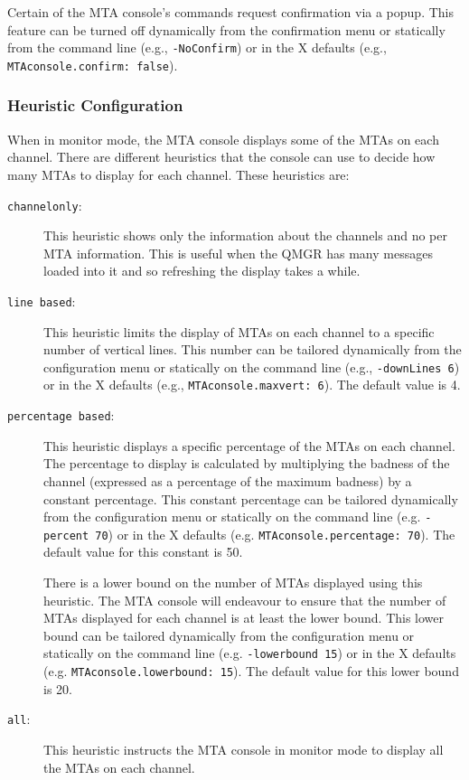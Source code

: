 Certain of the MTA console's commands request confirmation via a
popup.
This feature can be turned off dynamically from the confirmation menu
or statically from the command line (e.g., \verb+-NoConfirm+) or in the
X defaults (e.g., \verb+MTAconsole.confirm: false+).

\subsubsection 	{Heuristic Configuration} \label{sect:heur}

When in monitor mode, the MTA console displays some of the MTAs on each
channel.
There are different heuristics that the console can use to decide
how many MTAs to display for each channel.
These heuristics are:

\begin{description}
\item[\verb|channelonly|:] This heuristic shows only the information
about the channels and no per MTA information. This is useful when the
QMGR has many messages loaded into it and so refreshing the display
takes a while.

\item [\verb+line based+:] This heuristic limits the display of MTAs
on each channel to a specific number of vertical lines.  This number
can be tailored dynamically from the configuration menu or statically
on the command line (e.g., \verb+-downLines 6+) or in the X defaults
(e.g., \verb+MTAconsole.maxvert: 6+).  The default value is 4.

\item [\verb+percentage based+:] This heuristic displays a specific
percentage of the MTAs on each channel.  The percentage to display is
calculated by multiplying the badness of the channel (expressed as a
percentage of the maximum badness) by a constant percentage.  This
constant percentage can be tailored dynamically from the configuration
menu or statically on the command line (e.g.  {\verb+-percent 70+}) or
in the X defaults (e.g.  {\verb+MTAconsole.percentage: 70+}).  The
default value for this constant is 50.

There is a lower bound on the number of MTAs displayed using this
heuristic.
The MTA console will endeavour to ensure that the number of MTAs displayed
for each channel is at least the lower bound.
This lower bound can be tailored dynamically from the
configuration menu or statically on the command line (e.g.
\verb+-lowerbound 15+) or in the X defaults (e.g.
\verb+MTAconsole.lowerbound: 15+).
The default value for this lower bound is 20.

\item [\verb+all+:] This heuristic instructs the MTA console in
monitor mode to display all the MTAs on each channel.


\end{description}

